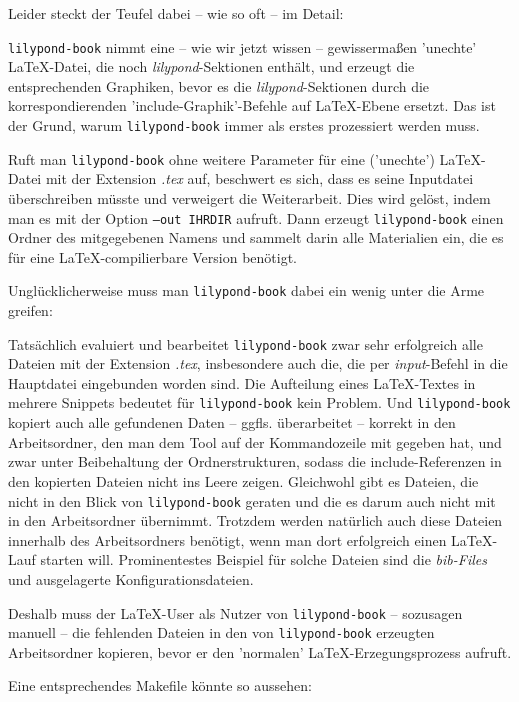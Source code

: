 Leider steckt der Teufel dabei -- wie so oft -- im Detail: 

\texttt{lilypond-book} nimmt eine -- wie wir jetzt wissen -- gewissermaßen
'unechte' \LaTeX-Datei, die noch \emph{lilypond}-Sektionen enthält, und erzeugt
die entsprechenden Graphiken, bevor es die \emph{lilypond}-Sektionen durch die
korrespondierenden 'include-Graphik'-Befehle auf \LaTeX-Ebene ersetzt. Das ist
der Grund, warum \texttt{lilypond-book} immer als erstes prozessiert werden
muss.

Ruft man \texttt{lilypond-book} ohne weitere Parameter für eine ('unechte')
\LaTeX-Datei mit der Extension \emph{.tex} auf, beschwert es sich, dass es seine
Inputdatei überschreiben müsste und verweigert die Weiterarbeit. Dies wird
gelöst, indem man es mit der Option \texttt{--out IHRDIR} aufruft. Dann erzeugt
\texttt{lilypond-book} einen Ordner des mitgegebenen Namens und sammelt darin
alle Materialien ein, die es für eine \LaTeX-compilierbare Version benötigt.

Unglücklicherweise muss man \texttt{lilypond-book} dabei ein wenig unter die Arme
greifen:

Tatsächlich evaluiert und bearbeitet \texttt{lilypond-book} zwar sehr
erfolgreich alle Dateien mit der Extension \emph{.tex}, insbesondere auch die,
die per \emph{input}-Befehl in die Hauptdatei eingebunden worden sind. Die
Aufteilung eines LaTeX-Textes in mehrere Snippets bedeutet für
\texttt{lilypond-book} kein Problem. Und \texttt{lilypond-book} kopiert auch
alle gefundenen Daten -- ggfls. überarbeitet -- korrekt in den Arbeitsordner,
den man dem Tool auf der Kommandozeile mit gegeben hat, und zwar unter
Beibehaltung der Ordnerstrukturen, sodass die include-Referenzen in den
kopierten Dateien nicht ins Leere zeigen. Gleichwohl gibt es Dateien, die nicht
in den Blick von \texttt{lilypond-book} geraten und die es darum auch nicht mit
in den Arbeitsordner übernimmt. Trotzdem werden natürlich auch diese Dateien
innerhalb des Arbeitsordners benötigt, wenn man dort erfolgreich einen
\LaTeX-Lauf starten will. Prominentestes Beispiel für solche Dateien sind die
\emph{bib-Files} und ausgelagerte Konfigurationsdateien.

Deshalb muss der \LaTeX-User als Nutzer von \texttt{lilypond-book} -- sozusagen
manuell -- die fehlenden Dateien in den von \texttt{lilypond-book} erzeugten
Arbeitsordner kopieren, bevor er den 'normalen' \LaTeX-Erzegungsprozess aufruft.

Eine entsprechendes Makefile könnte so aussehen:

